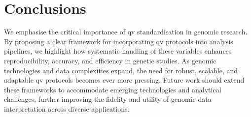 \section{Conclusions}
We emphasise the critical importance of \ac{qv} standardisation in genomic research. By proposing a clear framework for incorporating \ac{qv} protocols into analysis pipelines, we highlight how systematic handling of these variables enhances reproducibility, accuracy, and efficiency in genetic studies. As genomic technologies and data complexities expand, the need for robust, scalable, and adaptable \ac{qv} protocols becomes ever more pressing. Future work should extend these frameworks to accommodate emerging technologies and analytical challenges, further improving the fidelity and utility of genomic data interpretation across diverse applications.

\clearpage


%
%
%
%
%





